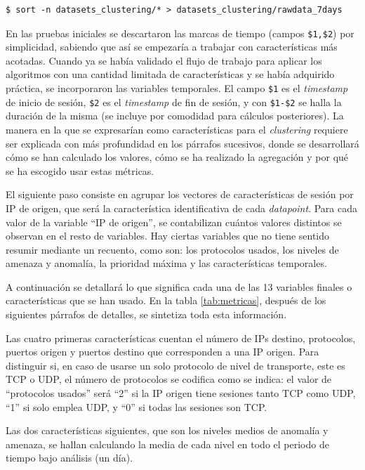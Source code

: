 \begin{verbatim}
$ sort -n datasets_clustering/* > datasets_clustering/rawdata_7days
\end{verbatim}

En las pruebas iniciales se descartaron las marcas de tiempo (campos \verb|$1,$2|) por simplicidad, sabiendo que así se empezaría a trabajar con características más acotadas.
Cuando ya se había validado el flujo de trabajo para aplicar los algoritmos con una cantidad limitada de características y se había adquirido práctica, se incorporaron las variables temporales.
El campo \verb|$1| es el \emph{timestamp} de inicio de sesión, \verb|$2| es el \emph{timestamp} de fin de sesión, y con \verb|$1-$2| se halla la duración de la misma (se incluye por comodidad para cálculos posteriores).
La manera en la que se expresarían como características para el \emph{clustering} requiere ser explicada con más profundidad en los párrafos sucesivos,
donde se desarrollará cómo se han calculado los valores, cómo se ha realizado la agregación y por qué se ha escogido usar estas métricas.

El siguiente paso consiste en agrupar los vectores de características de sesión por IP de origen, que será la característica identificativa de cada \emph{datapoint}.
Para cada valor de la variable ``IP de origen'', se contabilizan cuántos valores distintos se observan en el resto de variables.
Hay ciertas variables que no tiene sentido resumir mediante un recuento, como son: los protocolos usados, los niveles de amenaza y anomalía, la prioridad máxima y las características temporales.

A continuación se detallará lo que significa cada una de las 13 variables finales o características que se han usado.
En la tabla \ref{tab:metricas}, después de los siguientes párrafos de detalles, se sintetiza toda esta información.

Las cuatro primeras características cuentan el número de IPs destino, protocolos, puertos origen y puertos destino que corresponden a una IP origen.
Para distinguir si, en caso de usarse un solo protocolo de nivel de transporte, este es TCP o UDP, el número de protocolos se codifica como se indica:
el valor de ``protocolos usados'' será ``2'' si la IP origen tiene sesiones tanto TCP como UDP, ``1'' si solo emplea UDP, y ``0'' si todas las sesiones son TCP.

Las dos características siguientes, que son los niveles medios de anomalía y amenaza, se hallan calculando la media de cada nivel en todo el periodo de tiempo bajo análisis (un día).

